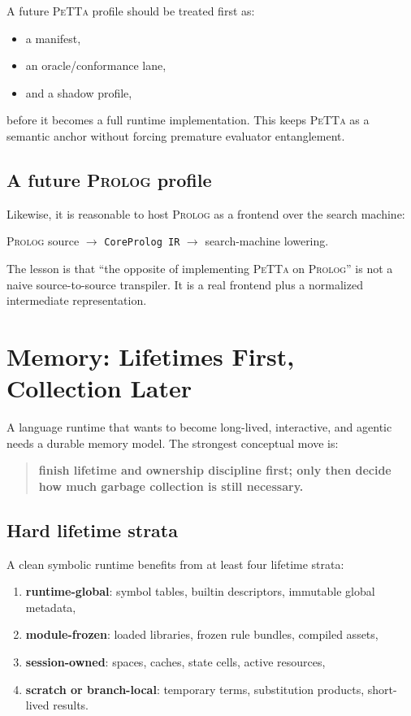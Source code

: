 \documentclass[11pt]{article}
\newcommand{\petta}{\textsc{PeTTa}}
\newcommand{\prolog}{\textsc{Prolog}}
\begin{document}
A future \petta{} profile should be treated first as:
\begin{itemize}[leftmargin=2em]
  \item a manifest,
  \item an oracle/conformance lane,
  \item and a shadow profile,
\end{itemize}

before it becomes a full runtime implementation. This keeps \petta{} as a semantic anchor without forcing premature evaluator entanglement.

\subsection{A future \prolog{} profile}

Likewise, it is reasonable to host \prolog{} as a frontend over the search machine:
\begin{center}
\prolog{} source $\rightarrow$ \texttt{CoreProlog IR} $\rightarrow$ search-machine lowering.
\end{center}

The lesson is that ``the opposite of implementing \petta{} on \prolog{}'' is not a naive source-to-source transpiler. It is a real frontend plus a normalized intermediate representation.

\section{Memory: Lifetimes First, Collection Later}

A language runtime that wants to become long-lived, interactive, and agentic needs a durable memory model. The strongest conceptual move is:
\begin{quote}
\textbf{finish lifetime and ownership discipline first; only then decide how much garbage collection is still necessary.}
\end{quote}

\subsection{Hard lifetime strata}

A clean symbolic runtime benefits from at least four lifetime strata:
\begin{enumerate}[leftmargin=2em]
  \item \textbf{runtime-global}: symbol tables, builtin descriptors, immutable global metadata,
  \item \textbf{module-frozen}: loaded libraries, frozen rule bundles, compiled assets,
  \item \textbf{session-owned}: spaces, caches, state cells, active resources,
  \item \textbf{scratch or branch-local}: temporary terms, substitution products, short-lived results.
\end{enumerate}
\end{document}
